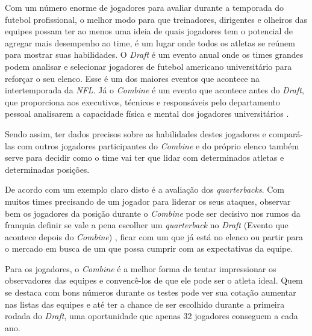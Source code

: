 Com um número enorme de jogadores para avaliar durante a temporada do futebol profissional, o melhor modo para que treinadores, dirigentes e olheiros das equipes possam ter ao menos uma ideia de quais jogadores tem o potencial de agregar mais desempenho ao time, é um lugar onde todos os atletas se reúnem para mostrar suas habilidades. O \textit{Draft} é um evento anual onde os times grandes podem analisar e selecionar jogadores de futebol americano universitário para reforçar o seu elenco. Esse é um dos maiores eventos que acontece na intertemporada da \textit{NFL}. Já o \textit{Combine} é um evento que acontece antes do \textit{Draft}, que proporciona aos executivos, técnicos e responsáveis pelo departamento pessoal analisarem a capacidade física e mental dos jogadores universitários \cite{MCGEE2003}.

Sendo assim, ter dados precisos sobre as habilidades destes jogadores e compará-las com outros jogadores participantes do \textit{Combine} e do próprio elenco também serve para decidir como o time vai ter que lidar com determinados atletas e determinadas posições.

De acordo com  um exemplo claro disto é a avaliação dos \textit{quarterbacks}. Com muitos times precisando de um jogador para liderar os seus ataques, observar bem os jogadores da posição durante o \textit{Combine} pode ser decisivo nos rumos da franquia definir se vale a pena escolher um \textit{quarterback} no \textit{Draft} (Evento que acontece depois do \textit{Combine}) , ficar com um que já está no elenco ou partir para o mercado em busca de um que possa cumprir com as expectativas da equipe.

Para os jogadores, o \textit{Combine} é a melhor forma de tentar impressionar os observadores das equipes e convencê-los de que ele pode ser o atleta ideal. Quem se destaca com bons números durante os testes pode ver sua cotação aumentar nas listas das equipes e até ter a chance de ser escolhido durante a primeira rodada do \textit{Draft}, uma oportunidade que apenas 32 jogadores conseguem a cada ano.



